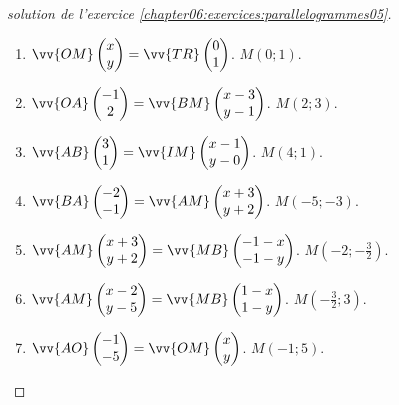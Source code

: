 \begin{proof}[solution de l'exercice  \ref{chapter06:exercices:parallelogrammes05}]   
	\begin{enumerate}[label=\alph*)]
		\item $\vv{OM}\begin{pmatrix}
			x\\ y 
		\end{pmatrix} =\vv{TR}\begin{pmatrix}
			0\\ 1
		\end{pmatrix}$. $M(0;1)$.
		\item $\vv{OA}\begin{pmatrix}
			-1\\ 2 
		\end{pmatrix} =\vv{BM}\begin{pmatrix}
			x-3\\ y-1
		\end{pmatrix}$. $M(2;3)$.
		\item $\vv{AB}\begin{pmatrix}
			3\\ 1 
		\end{pmatrix} =\vv{IM}\begin{pmatrix}
			x-1\\ y-0
		\end{pmatrix}$. $M(4;1)$.
		\item $\vv{BA}\begin{pmatrix}
			-2\\ -1 
		\end{pmatrix} =\vv{AM}\begin{pmatrix}
			x+3\\ y+2
		\end{pmatrix}$. $M(-5;-3)$.
		\item $\vv{AM}\begin{pmatrix}
			x+3\\ y+2 
		\end{pmatrix} =\vv{MB}\begin{pmatrix}
			-1-x\\ -1-y
		\end{pmatrix}$. $M(-2;-\tfrac{3}{2})$.
		\item $\vv{AM}\begin{pmatrix}
			x-2\\ y-5 
		\end{pmatrix} =\vv{MB}\begin{pmatrix}
			1-x\\ 1-y
		\end{pmatrix}$. $M(-\tfrac{3}{2};3)$.
		\item $\vv{AO}\begin{pmatrix}
			-1\\ -5 
		\end{pmatrix} =\vv{OM}\begin{pmatrix}
			x\\ y
		\end{pmatrix}$. $M(-1;5)$.
	\end{enumerate} 
\end{proof}
